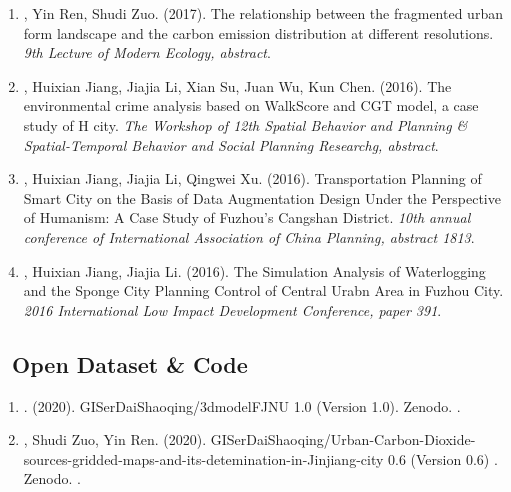 \begin{enumerate}
\item
    \Shaoqing, Yin Ren, Shudi Zuo. (2017).
    The relationship between the fragmented urban form landscape and the carbon emission distribution at different resolutions.
    \textit{9th Lecture of Modern Ecology, abstract}.
\item
    \Shaoqing, Huixian Jiang, Jiajia Li, Xian Su, Juan Wu, Kun Chen. (2016).
    The environmental crime analysis based on WalkScore and CGT model, a case study of H city.
    \textit{The Workshop of 12th Spatial Behavior and Planning \& Spatial-Temporal Behavior and Social Planning Researchg, abstract}.
\item
    \Shaoqing, Huixian Jiang, Jiajia Li, Qingwei Xu. (2016).
    Transportation Planning of Smart City on the Basis of Data Augmentation Design Under the Perspective of Humanism: A Case Study of Fuzhou's Cangshan District.
    \textit{10th annual conference of International Association of China Planning, abstract 1813}.
\item
    \Shaoqing, Huixian Jiang, Jiajia Li. (2016).
    The Simulation Analysis of Waterlogging and the Sponge City Planning Control of Central Urabn Area in Fuzhou City.
    \textit{2016 International Low Impact Development Conference, paper 391}.
\end{enumerate}

\subsection*{\texorpdfstring{\faBook\ Open Dataset \& Code}{Open Dataset \& Code}}
\begin{enumerate}
\item
   \Shaoqing. (2020).
    GISerDaiShaoqing/3dmodelFJNU 1.0 (Version 1.0). Zenodo. 
    .
\item
   \Shaoqing, Shudi Zuo, Yin Ren. (2020).
    GISerDaiShaoqing/Urban-Carbon-Dioxide-sources-gridded-maps-and-its-detemination-in-Jinjiang-city 0.6 (Version 0.6) . Zenodo. 
    .
\end{enumerate}

